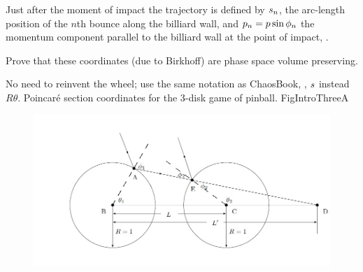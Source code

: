 {Just after
the moment of impact the trajectory  is defined by $s_n$, the arc-length
position of the $n$th bounce along the billiard wall, and
$p_n= p \sin \phi_n$
the momentum component parallel to the billiard wall
at the point of impact,
.

Prove that these coordinates (due to Birkhoff)
are phase space volume
preserving. 

No need to reinvent the wheel; 
use the same notation as ChaosBook, \ie, $s$ instead
$R \theta$. 
%
 {}{ Poincar\'e section coordinates for the
3-disk game of pinball.
    }{FigIntroThreeA}
%
}

\begin{figure}
\centering
\includegraphics[width=\textwidth]{exr2_1.jpg}
\end{figure}



